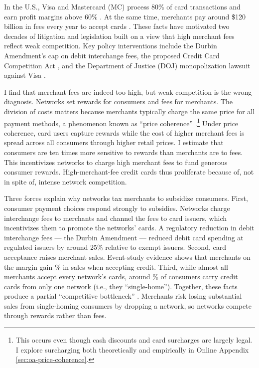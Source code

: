 \documentclass[main.tex]{subfiles}
\begin{document}
In the U.S., Visa and Mastercard (MC) process 80\% of card transactions
and earn profit margins above 60\% \parencite{Visa2020}.
At the same time, merchants pay around \$120 billion in fees every year to accept cards \parencite{Nilson2020a}.
These facts have motivated two decades of litigation and legislation built on a view that high merchant fees reflect weak competition.
Key policy interventions include the Durbin Amendment's cap on debit interchange fees, the proposed Credit Card Competition Act \parencite{Andriotis2022}, and the Department of Justice (DOJ) monopolization lawsuit against Visa \parencite{Au-Yeung2024}.

I find that merchant fees are indeed too high, but weak competition is the wrong diagnosis.
Networks set rewards for consumers and fees for merchants. 
The division of costs matters because merchants typically charge the same price for all payment methods, a phenomenon known as ``price coherence'' \parencite{Frankel1998, Stavins2018}.\footnote{
    This occurs even though cash discounts and card surcharges are largely legal.
    I explore surcharging both theoretically and empirically in Online Appendix \ref{sec:oa-price-coherence}.
}
Under price coherence, card users capture rewards while the cost of higher merchant fees is spread across all consumers through higher retail prices.
I estimate that consumers are ten times more sensitive to rewards than merchants are to fees.
This incentivizes networks to charge high merchant fees to fund generous consumer rewards.
High-merchant-fee credit cards thus proliferate because of, not in spite of, intense network competition.

Three forces explain why networks tax merchants to subsidize consumers.
First, consumer payment choices respond strongly to subsidies.
Networks charge interchange fees to merchants and channel the fees to card issuers, which incentivizes them to promote the networks' cards.
A regulatory reduction in debit interchange fees --- the Durbin Amendment --- reduced debit card spending at regulated issuers by around 25\% relative to exempt issuers.
Second, card acceptance raises merchant sales.
Event-study evidence shows that merchants on the margin gain \% in sales when accepting credit.
Third, while almost all merchants accept every network's cards, around \% of consumers carry credit cards from only one network (i.e., they ``single-home'').
Together, these facts produce a partial ``competitive bottleneck'' \parencite{Armstrong2006}. 
Merchants risk losing substantial sales from single-homing consumers by dropping a network, so networks compete through rewards rather than fees.
\end{document}
